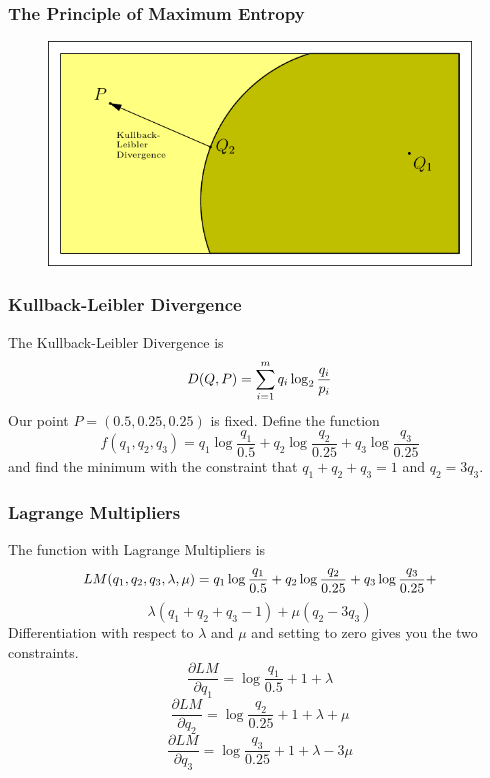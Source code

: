\documentclass[xcolor=dvipsnames]{beamer}
\begin{document}
\begin{frame}
  \frametitle{The Principle of Maximum Entropy}
\begin{figure}[h]
\includegraphics[scale=1.0]{constraint-d.pdf}
\end{figure}
\end{frame}

\begin{frame}
  \frametitle{Kullback-Leibler Divergence}
  The Kullback-Leibler Divergence is
\begin{equation}
  \label{eq:kl}
  D(Q,P)=\sum_{i=1}^{m}q_{i}\log_{2}\frac{q_{i}}{p_{i}}\notag
\end{equation}
Our point $P=(0.5,0.25,0.25)$ is fixed. Define the function
\begin{equation}
  \label{eq:nughaoqu}
  f(q_{1},q_{2},q_{3})=q_{1}\log\frac{q_{1}}{0.5}+q_{2}\log\frac{q_{2}}{0.25}+q_{3}\log\frac{q_{3}}{0.25}
\end{equation}
and find the minimum with the constraint that $q_{1}+q_{2}+q_{3}=1$
and $q_{2}=3q_{3}$.
\end{frame}

\begin{frame}
  \frametitle{Lagrange Multipliers}
  The function with Lagrange Multipliers is
  \begin{equation}
    \label{eq:eoreaque}
    LM(q_{1},q_{2},q_{3},\lambda,\mu)=q_{1}\log\frac{q_{1}}{0.5}+q_{2}\log\frac{q_{2}}{0.25}+q_{3}\log\frac{q_{3}}{0.25}+\notag
  \end{equation}
  \begin{equation}
    \label{eq:okeexeim}
    \lambda(q_{1}+q_{2}+q_{3}-1)+\mu(q_{2}-3q_{3})
  \end{equation}
Differentiation with respect to $\lambda$ and $\mu$ and setting to
zero gives you the two constraints.
\begin{equation}
  \label{eq:iceekasu}
  \frac{\partial{}LM}{\partial{}q_{1}}=\log\frac{q_{1}}{0.5}+1+\lambda
\end{equation}
\begin{equation}
  \label{eq:theiquae}
  \frac{\partial{}LM}{\partial{}q_{2}}=\log\frac{q_{2}}{0.25}+1+\lambda+\mu
\end{equation}
\begin{equation}
  \label{eq:laxiexeo}
  \frac{\partial{}LM}{\partial{}q_{3}}=\log\frac{q_{3}}{0.25}+1+\lambda-3\mu
\end{equation}
\end{frame}
\end{document}
